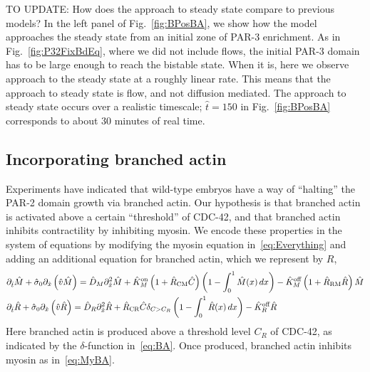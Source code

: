 \documentclass[11pt]{article}
\newcommand{\red}[1]{\color{red}#1\normalcolor}
\newcommand{\6}[1]{#1_{\text{6}}}
\newcommand{\3}[1]{#1_{\text{3}}}
\begin{document}
\red{TO UPDATE: } How does the approach to steady state compare to previous models? In the left panel of Fig.\ \ref{fig:BPosBA}, we show how the model approaches the steady state from an initial zone of PAR-3 enrichment. As in Fig.\ \ref{fig:P32FixBdEq}, where we did not include flows, the initial PAR-3 domain has to be large enough to reach the bistable state. When it is, here we observe approach to the steady state at a roughly linear rate. This means that the approach to steady state is flow, and not diffusion mediated. \red{The approach to steady state occurs over a realistic timescale; $\hat t=150$ in Fig.\ \ref{fig:BPosBA} corresponds to about 30 minutes of real time.}



\subsection{Incorporating branched actin}
Experiments have indicated that wild-type embryos have a way of ``halting'' the PAR-2 domain growth via branched actin. Our hypothesis is that branched actin is activated above a certain ``threshold'' of CDC-42, and that branched actin inhibits contractility by inhibiting myosin. We encode these properties in the system of equations by modifying the myosin equation in\ \eqref{eq:Everything} and adding an additional equation for branched actin, which we represent by $R$,  
\begin{subequations} 
\label{eq:BAll}
\begin{align}
\label{eq:MyBA}
&\partial_{\hat{t}} \hat{M} +\hat{\sigma}_0  \partial_{\hat{x}} \left(\hat{v} \hat{M} \right) =\hat{D}_M \partial_{\hat{x}}^2 \hat{M} +\hat{K}^\text{on}_M \left(1+\hat{R}_\text{CM} \hat C\right) \left(1-\int_0^1  \hat{M}(x) \, dx\right)- \hat{K}^\text{off}_M \left(1+\hat R_\text{RM} \hat R\right) \hat{M}\\
\label{eq:BA}
&\partial_{\hat{t}} \hat{R} +\hat{\sigma}_0  \partial_{\hat{x}} \left(\hat{v} \hat{R} \right) =\hat{D}_R \partial_{\hat{x}}^2 \hat{R} +\hat R_\text{CR} \hat C {\delta}_{C > C_R} \left(1-\int_0^1  \hat{R}(x) \, dx\right)- \hat{K}^\text{off}_R \hat{R}
\end{align}
\end{subequations}
Here branched actin is produced above a threshold level $C_R$ of CDC-42, as indicated by the $\delta$-function in\ \eqref{eq:BA}. Once produced, branched actin inhibits myosin as in\ \eqref{eq:MyBA}. 
\end{document}
